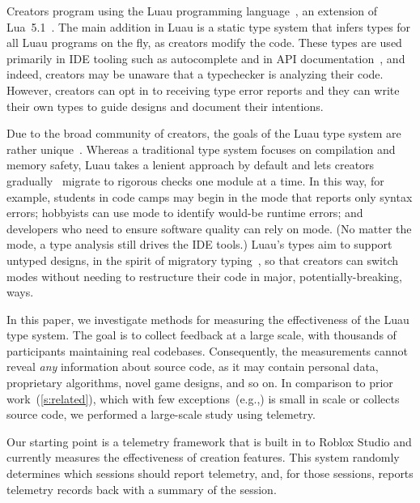 \documentclass[english,submission,cleveref]{programming}
\begin{document}
Creators program using the
{Luau} programming language~\cite{luau-lang.org},
an extension of {Lua~5.1~\cite{lua}}.
The main addition in Luau is a static type system that infers
types for all Luau programs on the fly, as creators modify the code.
These types are used primarily in IDE tooling such as autocomplete and
in API documentation~\cite{luau-autocomplete}, and indeed, creators
may be unaware that a typechecker is analyzing their code.
However, creators can opt in to receiving type error reports and they can write
their own types to guide designs and document their intentions.

Due to the broad community of creators, the goals of the Luau type
system are rather unique~\cite{bfj-hatra-2021}.
Whereas a traditional type system focuses on compilation and memory
safety, Luau takes a lenient approach by default and lets creators
gradually~\cite{st-sfp-2006,tf-popl-2008} migrate to rigorous checks
one module at a time.
In this way, for example,
students in code camps may begin in the \mnocheck{} mode that reports only
syntax errors; hobbyists can use \mnonstrict{} mode to identify
would-be runtime errors; and developers who need to ensure software
quality can rely on \mstrict{} mode.
(No matter the mode, a {\FS{}} type analysis still drives the IDE tools.)
Luau's types aim to support untyped designs, in the spirit of migratory
typing~\cite{tfffgksst-snapl-2017}, so that creators can switch modes without
needing to restructure their code in major, potentially-breaking, ways.

In this paper, we investigate methods for measuring the effectiveness
of the {Luau} type system.
The goal is to collect feedback at a large scale, with thousands
of participants maintaining real codebases.
Consequently, the measurements cannot reveal \emph{any} information about
source code, as it may contain personal data, proprietary algorithms, novel
game designs, and so on.
In comparison to prior work~(\cref{s:related}), which
with few exceptions~(e.g.,\cite{hlzbr-ecoop-2021}) is small in scale
or collects source code, we performed a large-scale study using \panon{}
{telemetry}.

Our starting point is a telemetry framework that is built in
to {Roblox Studio} and currently measures the effectiveness of
creation features.
This system randomly determines which sessions should report telemetry, and,
for those sessions, reports telemetry records back with a summary of the
session.
\end{document}
